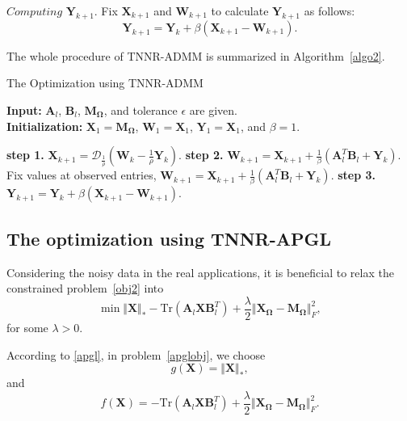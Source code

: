\documentclass{article}
\begin{document}
{$\textit{Computing}$  $\mathbf Y_{k+1}$. Fix $\mathbf X_{k+1}$ and $\mathbf W_{k+1}$ to calculate $\mathbf Y_{k+1}$ as follows:
\begin{equation}
    \mathbf Y_{k+1} = \mathbf Y_{k} + \beta(\mathbf X_{k+1} - \mathbf W_{k+1}).
\end{equation}

The whole procedure of TNNR-ADMM is summarized in Algorithm~\ref{algo2}.


\begin{algorithm}[t]
    \caption{The Optimization using TNNR-ADMM}
    \label{algo2}
    \textbf{Input:} $\mathbf A_l$, $\mathbf B_l$, $\mathbf M_{\mathbf\Omega}$, and tolerance $\epsilon$ are given.\\
    \textbf{Initialization:} $\mathbf X_1 = \mathbf M_{\mathbf\Omega}$, $\mathbf W_1 = \mathbf X_1$, $\mathbf Y_1=\mathbf X_1$, and $\beta = 1$. 
    \begin{algorithmic}
        \Repeat 
        \State \textbf{step 1.} $\mathbf X_{k+1} = \mathcal{D}_{\frac{1}{\rho}}(\mathbf W_k - \frac{1}{\rho}\mathbf Y_k)$.
        \State \textbf{step 2.} $\mathbf W_{k+1} = \mathbf X_{k+1} + \frac{1}{\beta}(\mathbf A_l^T\mathbf B_l + \mathbf Y_k)$.
        \State Fix values at observed entries, 
        $\mathbf W_{k+1} = \mathbf X_{k+1} + \frac{1}{\beta}(\mathbf A_l^T\mathbf B_l + \mathbf Y_k)$.
        \State \textbf{step 3.} $\mathbf Y_{k+1} = \mathbf Y_{k} + \beta(\mathbf X_{k+1} -\mathbf W_{k+1})$.
    \end{algorithmic}
\end{algorithm}

\subsection{The optimization using TNNR-APGL}
Considering the noisy data in the real applications, it is beneficial to relax the constrained problem~\eqref{obj2} into
\begin{equation}
    \min \Vert\mathbf X \Vert_* - \text{Tr}(\mathbf A_l\mathbf X\mathbf B_l^T) + \frac{\lambda}{2}\Vert\mathbf X_{\mathbf\Omega} -\mathbf M_{\mathbf\Omega} \Vert^2_F,
    \label{apglobj}
\end{equation}
for some $\lambda >0$.

According to \eqref{apgl}, in problem~\eqref{apglobj}, we choose
\begin{equation*}
    g(\mathbf X) = \Vert\mathbf X \Vert_*,
\end{equation*}
and
\begin{equation*}
    f(\mathbf X) = - \text{Tr}(\mathbf A_l\mathbf X\mathbf B_l^T) + \frac{\lambda}{2}\Vert\mathbf X_{\mathbf\Omega} -\mathbf M_{\mathbf\Omega} \Vert^2_F.
\end{equation*}

}
\end{document}

